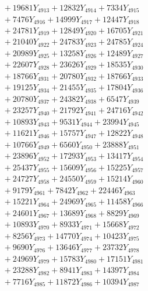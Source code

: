 \documentclass[a4paper,10pt]{article}
\begin{document}
{\begin{align}
&\;  + 19681 Y_{4913} + 12832 Y_{4914} + 7334 Y_{4915} \\[0.3ex]
&\;  + 7476 Y_{4916} + 14999 Y_{4917} + 12447 Y_{4918} \\[0.5ex]\allowbreak
&\;  + 24781 Y_{4919} + 12849 Y_{4920} + 16705 Y_{4921} \\[0.3ex]
&\;  + 21040 Y_{4922} + 24783 Y_{4923} + 24785 Y_{4924} \\[0.3ex]
&\;  + 20989 Y_{4925} + 13258 Y_{4926} + 12489 Y_{4927} \\[0.3ex]
&\;  + 22607 Y_{4928} + 23626 Y_{4929} + 18535 Y_{4930} \\[0.3ex]
&\;  + 18766 Y_{4931} + 20780 Y_{4932} + 18766 Y_{4933} \\[0.3ex]
&\;  + 19125 Y_{4934} + 21455 Y_{4935} + 17804 Y_{4936} \\[0.3ex]
&\;  + 20780 Y_{4937} + 24382 Y_{4938} + 6547 Y_{4939} \\[0.3ex]
&\;  + 23257 Y_{4940} + 21792 Y_{4941} + 24716 Y_{4942} \\[0.3ex]
&\;  + 10893 Y_{4943} + 9531 Y_{4944} + 23994 Y_{4945} \\[0.3ex]
&\;  + 11621 Y_{4946} + 15757 Y_{4947} + 12822 Y_{4948} \\[0.5ex]\allowbreak
&\;  + 10766 Y_{4949} + 6560 Y_{4950} + 23888 Y_{4951} \\[0.3ex]
&\;  + 23896 Y_{4952} + 17293 Y_{4953} + 13417 Y_{4954} \\[0.3ex]
&\;  + 25437 Y_{4955} + 15609 Y_{4956} + 15225 Y_{4957} \\[0.3ex]
&\;  + 24727 Y_{4958} + 24550 Y_{4959} + 15214 Y_{4960} \\[0.3ex]
&\;  + 9179 Y_{4961} + 7842 Y_{4962} + 22446 Y_{4963} \\[0.3ex]
&\;  + 15221 Y_{4964} + 24969 Y_{4965} + 11458 Y_{4966} \\[0.3ex]
&\;  + 24601 Y_{4967} + 13689 Y_{4968} + 8829 Y_{4969} \\[0.3ex]
&\;  + 10893 Y_{4970} + 8933 Y_{4971} + 15668 Y_{4972} \\[0.3ex]
&\;  + 8256 Y_{4973} + 14770 Y_{4974} + 10423 Y_{4975} \\[0.3ex]
&\;  + 9690 Y_{4976} + 13646 Y_{4977} + 23732 Y_{4978} \\[0.5ex]\allowbreak
&\;  + 24969 Y_{4979} + 15783 Y_{4980} + 17151 Y_{4981} \\[0.3ex]
&\;  + 23288 Y_{4982} + 8941 Y_{4983} + 14397 Y_{4984} \\[0.3ex]
&\;  + 7716 Y_{4985} + 11872 Y_{4986} + 10394 Y_{4987} \\[0.3ex]

\end{align}}
\end{document}
